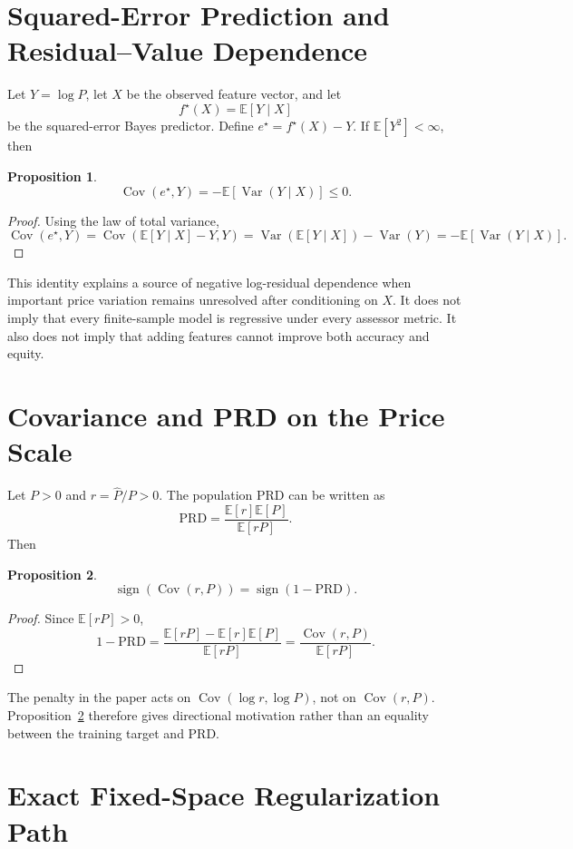 \documentclass[10pt]{article}
\newtheorem{proposition}{Proposition}
\theoremstyle{definition}
\newcommand{\E}{\mathbb{E}}
\newcommand{\Cov}{\operatorname{Cov}}
\newcommand{\Var}{\operatorname{Var}}
\newcommand{\1}{\mathbf{1}}
\begin{document}
\section{Squared-Error Prediction and Residual--Value Dependence}
\label{app:population_identity}

Let $Y=\log P$, let $X$ be the observed feature vector, and let
\[
f^\star(X)=\E[Y\mid X]
\]
be the squared-error Bayes predictor. Define $e^\star=f^\star(X)-Y$. If $\E[Y^2]<\infty$, then
\begin{proposition}
\label{prop:bayes_covariance}
\[
\Cov(e^\star,Y)
=
-\E[\Var(Y\mid X)]
\le 0.
\]
\end{proposition}
\begin{proof}
Using the law of total variance,
\[
\Cov(e^\star,Y)
=
\Cov(\E[Y\mid X]-Y,Y)
=
\Var(\E[Y\mid X])-\Var(Y)
=
-\E[\Var(Y\mid X)].
\]
\end{proof}

This identity explains a source of negative log-residual dependence when important price variation remains unresolved after conditioning on $X$. It does not imply that every finite-sample model is regressive under every assessor metric. It also does not imply that adding features cannot improve both accuracy and equity.

\section{Covariance and PRD on the Price Scale}
\label{app:cov_prd}

Let $P>0$ and $r=\widehat P/P>0$. The population PRD can be written as
\[
\mathrm{PRD}
=
\frac{\E[r]\E[P]}{\E[rP]}.
\]
Then
\begin{proposition}
\label{prop:cov_prd}
\[
\operatorname{sign}\!\left(\Cov(r,P)\right)
=
\operatorname{sign}(1-\mathrm{PRD}).
\]
\end{proposition}
\begin{proof}
Since $\E[rP]>0$,
\[
1-\mathrm{PRD}
=
\frac{\E[rP]-\E[r]\E[P]}{\E[rP]}
=
\frac{\Cov(r,P)}{\E[rP]}.
\]
\end{proof}

The penalty in the paper acts on $\Cov(\log r,\log P)$, not on $\Cov(r,P)$. Proposition~\ref{prop:cov_prd} therefore gives directional motivation rather than an equality between the training target and PRD.

\section{Exact Fixed-Space Regularization Path}
\label{app:theory}
\end{document}
